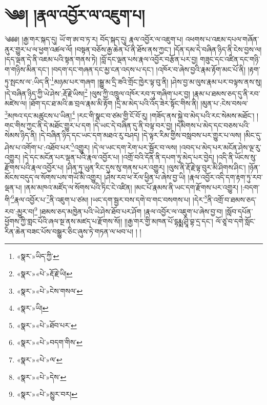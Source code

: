 \chapter{༄༅། །རྣལ་འབྱོར་ལ་འཇུག་པ།}༄༅༅། །རྒྱ་གར་སྐད་དུ། ཡོ་ག་ཨ་བ་ཏ་ར། བོད་སྐད་དུ། རྣལ་འབྱོར་ལ་འཇུག་པ། འཕགས་པ་འཇམ་དཔལ་གཞོན་ནུར་གྱུར་པ་ལ་ཕྱག་འཚལ་ལོ། །བསྟན་བཅོས་རྒྱ་ཆེན་པོ་ནི་ཐོས་ནས་ཀྱང་། །དོན་དམ་དེ་བཞིན་ཉིད་ནི་ངེས་བྱས་ལ། །དད་ལྡན་དེ་ནི་འཇམ་པའི་སྟན་གནས་ཏེ། །བློ་དང་ལྡན་པས་རྣལ་འབྱོར་བརྩོན་པར་བྱ། གཟུང་དང་འཛིན་དང་གཉི་ག་གཉིས་མིན་དང་། །བདག་དང་གཞན་དང་མྱ་ངན་འདས་པ་དང་། །འཁོར་བ་ཞེས་བྱའི་རྣམ་རྟོག་མང་པོ་ནི། །རྟག་ཏུ་སྤངས་ལ་:ཡིད་ནི་\footnote{«སྣར་»ཡིད་ཀྱི་}མཉམ་པར་གཞག །སྒྱུ་མ་དྲི་ཟའི་གྲོང་ཁྱེར་ལྟ་བུ་ནི། །ཤེས་བྱ་མ་ལུས་རྣམ་པར་བལྟས་ནས་སུ། །དེ་བཞིན་ཉིད་ཀྱི་ཡེ་ཤེས་:རྡོ་རྗེ་ཡིས།\footnote{«སྣར་»«པེ་»རྡོ་རྗེ་ཡི།} །ལུས་ཀྱི་འཁྲུལ་འཁོར་རབ་ཏུ་གཞིག་པར་བྱ། །རྣམ་པ་ཐམས་ཅད་དུ་ནི་རབ་མཛེས་ལ། །ཐོག་དང་ཐ་མའི་ཆ་བྲལ་རྣམ་མི་རྟོག །དྲི་མ་མེད་པའི་འོད་ཟེར་སྟོང་གིས་ནི། །མུན་པ་:ངེས་བསལ་\footnote{«སྣར་»«པེ་»ངེས་གསལ་}མཁའ་དང་མཚུངས་པ་ཡིན།\footnote{«སྣར་»ཡི།} །རང་གི་སྣང་བ་ཙམ་གྱི་ངོ་བོ་རུ། །གཟོད་ནས་སྐྱེ་བ་མེད་པའི་རང་སེམས་མཐོང་། །གང་གིས་ཀྱང་ནི་དེ་མཐོང་གྱུར་པ་དག །དེ་ཡང་དེ་བཞིན་དུ་ནི་བལྟ་བར་བྱ། །དམིགས་པ་མེད་དང་བཅས་པའི་སེམས་ཉིད་ནི། །དེ་བཞིན་ཉིད་དང་ཡང་དག་མཐའ་རུ་བཤད། །དེ་ལྟར་རིམ་གྱིས་བསླབས་པར་གྱུར་པ་ལས། །མིང་དུ་ཤེས་པ་འགོག་པ་:འཐོབ་པར་\footnote{«སྣར་»«པེ་»ཐོབ་པར་}འགྱུར། །དེ་ལ་ཡང་དག་རེག་པར་སྦྱོར་བ་ལས། །འབད་པ་མེད་པར་མངོན་ཤེས་ལྔ་རུ་འགྱུར། །དེ་དང་མངོན་པར་ལྡན་པའི་རྣལ་འབྱོར་པ། །འགྲོ་བའི་དོན་ནི་དཔག་ཏུ་མེད་པར་བྱེད། །འདི་ནི་ཡོངས་སུ་རྫོགས་པའི་རྣལ་འབྱོར་པ། །ཤིན་ཏུ་ཡུན་རིང་དུས་སུ་གནས་པར་འགྱུར། །ལུས་ནི་རྡོ་རྗེ་ལྟ་བུར་མི་ཤིགས་ཤིང་། །ཉོན་མོངས་བདུད་ལ་སོགས་པས་གཡོ་མི་འགྱུར། །ཤེས་རབ་ཕ་རོལ་ཕྱིན་པ་ཞེས་བྱ་ཡི། །རྣལ་འབྱོར་འདི་དག་རྟག་ཏུ་རབ་ལྡན་པ། །ནམ་མཁའ་མཛོད་ལ་སོགས་པའི་ཏིང་ངེ་འཛིན། །མང་པོ་རྣམས་ནི་ཡང་དག་རྫོགས་པར་འགྱུར། །:བདག་གི་\footnote{«སྣར་»«པེ་»བདག་གིས་}རྣལ་འབྱོར་པ་\footnote{«སྣར་»«པེ་»ལ་}ནི་འཇུག་པ་ཙམ། །ཡང་དག་སྦྱར་བས་དགེ་བ་གང་བསགས་པ། །དེར་\footnote{«སྣར་»«པེ་»དེས་}ནི་འགྲོ་བ་ཐམས་ཅད་རབ་:མྱུར་བ།\footnote{«སྣར་»«པེ་»མྱུར་བར།} །ཐམས་ཅད་མཁྱེན་པའི་ཡེ་ཤེས་ཐོབ་པར་ཤོག །རྣལ་འབྱོར་ལ་འཇུག་པ་ཞེས་བྱ་བ། །སློབ་དཔོན་ཕྱོགས་ཀྱི་གླང་པོའི་ཞལ་སྔ་ནས་མཛད་པ་རྫོགས་སོ།། །།རྒྱ་གར་གྱི་མཁན་པོ་དྷརྨྨ་ཤྲཱི་བྷ་དྲ་དང་། ལོ་ཙཱ་བ་དགེ་སློང་རིན་ཆེན་བཟང་པོས་བསྒྱུར་ཅིང་ཞུས་ཏེ་གཏན་ལ་ཕབ་པ། ། །